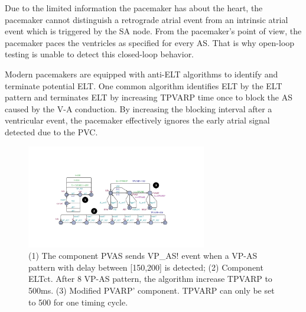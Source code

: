 Due to the limited information the pacemaker has about the heart, the pacemaker cannot distinguish a retrograde atrial event from an intrinsic atrial event which is triggered by the SA node. From the pacemaker's point of view, the pacemaker paces the ventricles as specified for every AS. That is why open-loop testing is unable to detect this closed-loop behavior. 

Modern pacemakers are equipped with anti-ELT algorithms to identify and terminate potential ELT. One common algorithm identifies ELT by the ELT pattern and terminates ELT by increasing TPVARP time once to block the AS caused by the V-A conduction. By increasing the blocking interval after a ventricular event, the pacemaker effectively ignores the early atrial signal detected due to the PVC.
\begin{figure}
		\centering
		\includegraphics[width=0.7\textwidth]{figs/ELT_count.pdf}
		\caption{\small (1) The component \textsf{PVAS} sends \textsf{VP\_AS!} event when a VP-AS pattern with delay between [150,200] is detected; (2) Component \textsf{ELTct}. After 8 VP-AS pattern, the algorithm increase TPVARP to 500ms. (3) Modified \textsf{PVARP'} component. TPVARP can only be set to 500 for one timing cycle.}
		\label{fig:ELT_count}
\end{figure}
